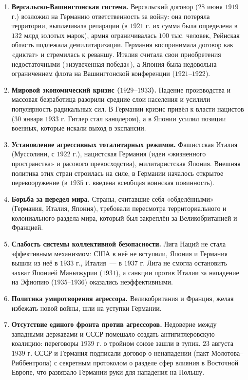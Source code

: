\documentclass[12pt]{article}
\begin{document}
	\begin{enumerate}
		\item \textbf{Версальско-Вашингтонская система.} Версальский договор ($28$ июня $1919$ г.) возложил на Германию ответственность за войну: она потеряла территории, выплачивала репарации (в $1921$ г. их сумма была определена в $132$ млрд золотых марок), армия ограничивалась $100$ тыс. человек, Рейнская область подлежала демилитаризации. Германия воспринимала договор как «диктат» и стремилась к реваншу. Италия считала свои приобретения недостаточными («изувеченная победа»), а Япония была недовольна ограничением флота на Вашингтонской конференции ($1921$--$1922$).
		\item \textbf{Мировой экономический кризис ($1929$--$1933$).} Падение производства и массовая безработица разорили средние слои населения и усилили популярность радикальных сил. В Германии кризис привёл к власти нацистов ($30$ января $1933$ г. Гитлер стал канцлером), а в Японии усилил позиции военных, которые искали выход в экспансии.
		\item \textbf{Установление агрессивных тоталитарных режимов.} Фашистская Италия (Муссолини, с $1922$ г.), нацистская Германия (идеи «жизненного пространства» и расового превосходства), милитаристская Япония. Внешняя политика этих стран строилась на силе, в Германии началось открытое перевооружение (в $1935$ г. введена всеобщая воинская повинность).
		\item \textbf{Борьба за передел мира.} Страны, считавшие себя «обделёнными» (Германия, Италия, Япония), требовали пересмотра территориального и колониального раздела мира, который был закреплён за Великобританией и Францией.
		\item \textbf{Слабость системы коллективной безопасности.} Лига Наций не стала эффективным механизмом: США в неё не вступили, Япония и Германия вышли из неё в $1933$ г., Италия~--- в $1937$ г. Лига не смогла остановить захват Японией Маньчжурии ($1931$), а санкции против Италии за нападение на Эфиопию ($1935$--$1936$) оказались неэффективными.
		\item \textbf{Политика умиротворения агрессора.} Великобритания и Франция, желая избежать новой войны, шли на уступки Германии.
		\item \textbf{Отсутствие единого фронта против агрессоров.} Недоверие между западными державами и СССР помешало создать антигитлеровскую коалицию: переговоры $1939$ г. о тройном союзе зашли в тупик. $23$ августа $1939$ г. СССР и Германия подписали договор о ненападении (пакт Молотова--Риббентропа) с секретным протоколом о разделе сфер влияния в Восточной Европе, что развязало Германии руки для нападения на Польшу.
	\end{enumerate}
\end{document}
